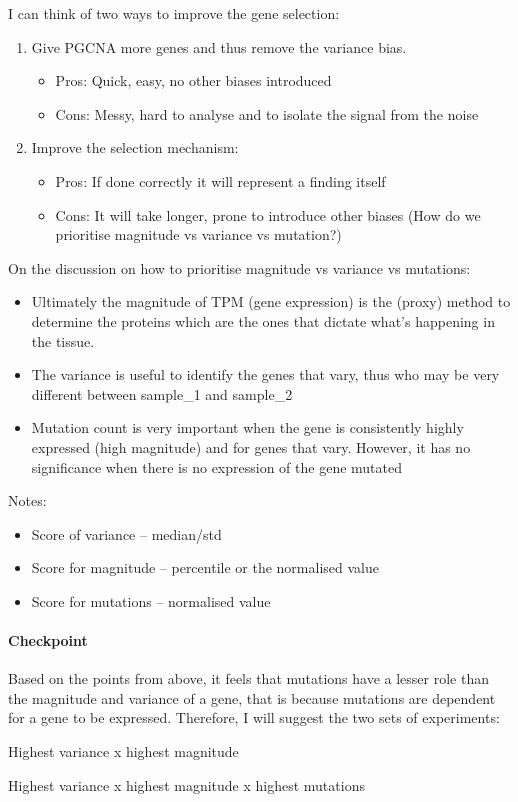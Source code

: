 I can think of two ways to improve the gene selection:
\begin{enumerate}
    \item Give PGCNA more genes and thus remove the variance bias.
          \begin{itemize}
              \item Pros: Quick, easy, no other biases introduced
              \item Cons: Messy, hard to analyse and to isolate the signal from the noise
          \end{itemize}
    \item Improve the selection mechanism:
          \begin{itemize}
              \item Pros: If done correctly it will represent a finding itself
              \item Cons: It will take longer, prone to introduce other biases (How do we prioritise magnitude vs variance vs mutation?)
          \end{itemize}
\end{enumerate}

On the discussion on how to prioritise magnitude vs variance vs mutations:
\begin{itemize}
    \item Ultimately the magnitude of TPM (gene expression) is the (proxy) method to determine the proteins which are the ones that dictate what's happening in the tissue.
    \item The variance is useful to identify the genes that vary, thus who may be very different between sample\_1 and sample\_2
    \item Mutation count is very important when the gene is consistently highly expressed (high magnitude) and for genes that vary. However, it has no significance when there is no expression of the gene mutated
\end{itemize}


Notes:
\begin{itemize}
    \item Score of variance – median/std
    \item Score for magnitude – percentile or the normalised value
    \item Score for mutations – normalised value
\end{itemize}


\paragraph{Checkpoint}
Based on the points from above, it feels that mutations have a lesser role than the magnitude and variance of a gene, that is because mutations are dependent for a gene to be expressed. Therefore, I will suggest the two sets of experiments:
\begin{todolist}
    \item Highest variance x highest magnitude
    \item Highest variance x highest magnitude x highest mutations
\end{todolist}


